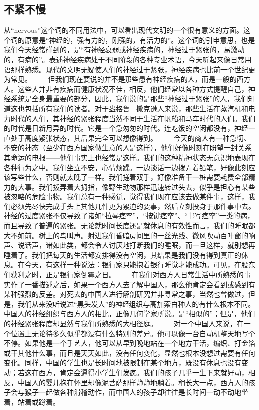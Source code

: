 \documentclass[12pt,oneside]{book}
\begin{document}
\begin{common-format}
\chapter{不紧不慢}
从“nervous”这个词的不同用法中，可以看出现代文明的一个很有意义的方面。这个词的原意是“神经的，强有力的，刚强的，有活力的”。这个词的引申意思，也是我们今天经常碰到的，是“有神经衰弱或神经疾病的，神经过于紧张的，易激动的，有病的”。表述神经疾病处于不同阶段的各种专业术语，今天听起来像日常用语那样熟悉。现代的文明无疑使人们的神经过于紧张，神经疾病也比前一个世纪更为常见。 
　　但我们现在要说的并不是那些患有神经疾病的人，而是一般的西方人。这些人并非有疾病而健康状况不佳，相反，他们经常以各种方式提醒自己，神经系统是全身最重要的部分，因此，我们说的是那些“神经过于紧张”的人，我们知道这也包括所有我们的读者。对于盎格鲁－撒克逊人来说，那些生活在蒸汽机和电力时代的人们，其神经的紧张程度当然不同于生活在帆船和马车时代的人们。我们的时代是日新月异的时代。它是一个急匆匆的时代。连吃饭的空闲都没有，神经一直处于高度紧张状态，其后果完全可以想像得到。 
　　今天的商人有一种急切、不安的神态（至少在西方国家做生意的人是这样），他们好像时刻在盼望一封关系其命运的电报——他们事实上也经常是这样。我们的这种精神状态无意识地表现在各种行为之中。我们坐立不安，心情烦躁。一边谈话一边拨弄着铅笔，好像此刻应该写些什么，否则就太晚了一样。我们搓着双手，好像准备干一桩需要耗费全部精力的大事。我们拨弄着大拇指，像野生动物那样迅速转过头去，似乎是担心有某些被忽略的危险事物。我们总有一种感觉，觉得我们现在应该去做某件事，这样，我们必须先尽快完成手头上其他几件更为紧迫的要事，然后立刻投身于那件事中去。神经的过度紧张不仅导致了诸如“拉琴痉挛”，“按键痉挛”、“书写痉挛”一类的病，而且导致了普遍的紧张。无论就时间长度还是就休息的有效性而言，我们的睡眠都大不如前。树上的鸟叫声。射进我们昏暗房间里的一丝光线、微风吹动百叶窗的响声、说话声，诸如此类，都会令人讨厌地打断我们的睡眠，而一旦这样，就别想再睡着了。我们把每天的生活都安排得没有空闲，其结果是我们没有得到真正的休息。在今天，有这样一种说法：银行家只能抱着银行睡觉才能成功。可见，在股东们获利之时，正是银行家倒霉之日。 
　　在我们对西方人日常生活中所熟悉的事实作了一番描述之后，如果一个西方人去了解中国人，那么他肯定会看到或感到有某种强烈的反差。对死去的中国人进行解剖研究并非寻常之事，当然也曾做过，但是，我们从来没听说过“黑头发人”的神经组织与高加索白种人的有什么根本不同。中国人的神经组织与西方人的相比，正像几何学家所说。是“相似的”；但是，他们的神经紧张程度却显然与我们所熟悉的大相径庭。 
　　对一个中国人来说，在一个位置上无论待多久似乎都没有什么特别的差异。他可以像一台自动机整天地写个不停。如果他是一个手艺人，他可以从早到晚地站在一个地方干活，编织、打金箔或干其他什么事，而且是天天如此，没有任何变化，显然也根本没想过需要有任何变化。同样，中国的学生也是长时间地被限制在某个地方，既没有休息也没有变动；若这在西方，肯定会逼得小学生们发疯。我们的孩子几乎一生下来就好动，相反，中国人的婴儿抱在怀里却像泥菩萨那样静静地躺着。稍长大一点，西方人的孩子会与猴子一起做各种滑稽动作，而中国人的孩子却往往是长时间一动不动地坐着，站着或蹲着。 

\end{common-format}
\end{document}
